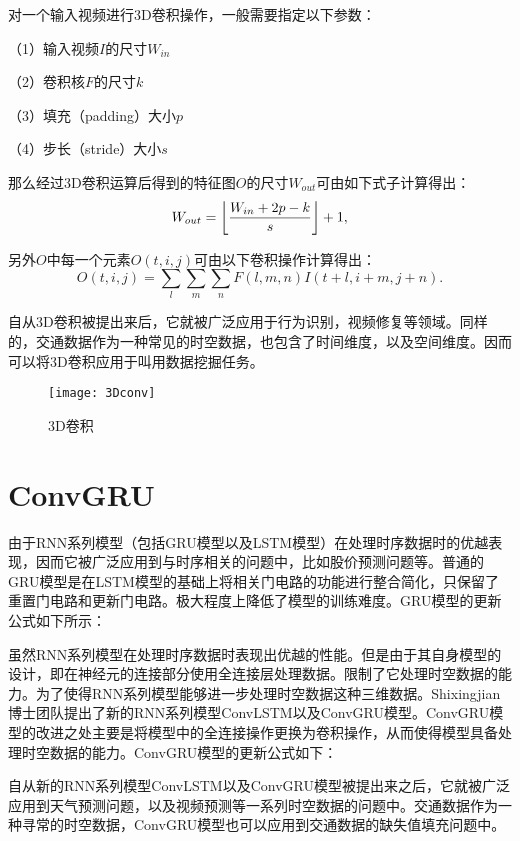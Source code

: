 对一个输入视频进行3D卷积操作，一般需要指定以下参数：

（1）输入视频$I$的尺寸$W_{in}$

（2）卷积核$F$的尺寸$k$

（3）填充（padding）大小$p$

（4）步长（stride）大小$s$

那么经过3D卷积运算后得到的特征图$O$的尺寸$W_{out}$可由如下式子计算得出：
\begin{equation}
	W_{out}=\bigg{\lfloor} \frac{W_{in}+2p-k}{s} \bigg{\rfloor} + 1,
\end{equation}

另外$O$中每一个元素$O(t,i,j)$可由以下卷积操作计算得出：
\begin{equation}
	O(t, i, j) = \sum_{l} \sum_{m} \sum_{n} F(l, m, n) I(t+l, i+m, j+n).
\end{equation}

自从3D卷积被提出来后，它就被广泛应用于行为识别\cite{tran2018closer}，视频修复\cite{wang2019video}等领域。同样的，交通数据作为一种常见的时空数据，也包含了时间维度，以及空间维度。因而可以将3D卷积应用于叫用数据挖掘任务\cite{yu20193d, guo2019deep}。
\begin{figure}[htbp] 
\centering
\texttt{[image: 3Dconv]}
\caption{3D卷积 \label{3Dconv}}
\end{figure}

\section{ConvGRU}
由于RNN系列模型（包括GRU模型以及LSTM模型）在处理时序数据时的优越表现，因而它被广泛应用到与时序相关的问题中，比如股价预测问题等。普通的GRU模型是在LSTM模型的基础上将相关门电路的功能进行整合简化，只保留了重置门电路和更新门电路。极大程度上降低了模型的训练难度。GRU模型的更新公式如下所示：

虽然RNN系列模型在处理时序数据时表现出优越的性能。但是由于其自身模型的设计，即在神经元的连接部分使用全连接层处理数据。限制了它处理时空数据的能力。为了使得RNN系列模型能够进一步处理时空数据这种三维数据。Shixingjian博士团队提出了新的RNN系列模型ConvLSTM以及ConvGRU模型。ConvGRU模型的改进之处主要是将模型中的全连接操作更换为卷积操作，从而使得模型具备处理时空数据的能力。ConvGRU模型的更新公式如下：

自从新的RNN系列模型ConvLSTM以及ConvGRU模型被提出来之后，它就被广泛应用到天气预测问题，以及视频预测等一系列时空数据的问题中。交通数据作为一种寻常的时空数据，ConvGRU模型也可以应用到交通数据的缺失值填充问题中。

